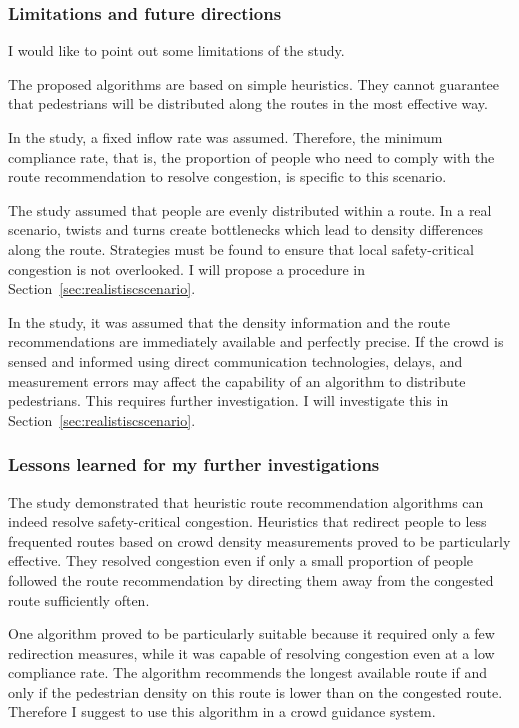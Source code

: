 \subsubsection{Limitations and future directions}

I would like to point out some limitations of the study.

The proposed algorithms are based on simple heuristics. They cannot guarantee that pedestrians will be distributed along the routes in the most effective way.

In the study, a fixed inflow rate was assumed. Therefore, the minimum compliance rate, that is, the proportion of people who need to comply with the route recommendation to resolve congestion, is specific to this scenario. 

The study assumed that people are evenly distributed within a route. In a real scenario, twists and turns create bottlenecks which lead to density differences along the route. Strategies must be found to ensure that local safety-critical congestion is not overlooked. I will propose a procedure in Section~\ref{sec:realistiscscenario}.

In the study, it was assumed that the density information and the route recommendations are immediately available and perfectly precise. If the crowd is sensed and informed using direct communication technologies, delays, and measurement errors may affect the capability of an algorithm to distribute pedestrians. This requires further investigation. I will investigate this in Section~\ref{sec:realistiscscenario}.





\subsubsection{Lessons learned for my further investigations}

The study demonstrated that heuristic route recommendation algorithms can indeed resolve safety-critical congestion. Heuristics that redirect people to less frequented routes based on crowd density measurements proved to be particularly effective. They resolved congestion even if only a small proportion of people followed the route recommendation by directing them away from the congested route sufficiently often. 

One algorithm proved to be particularly suitable because it required only a few redirection measures, while it was capable of resolving congestion even at a low compliance rate. The algorithm recommends the longest available route if and only if the pedestrian density on this route is lower than on the congested route. Therefore I suggest to use this algorithm in a crowd guidance system.




